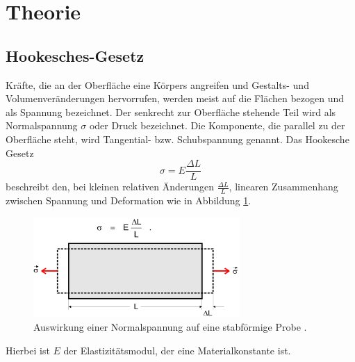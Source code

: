 \section{Theorie}
\label{sec:Theorie}
\subsection{Hookesches-Gesetz}
Kräfte, die an der Oberfläche eine Körpers angreifen und Gestalts- und Volumenveränderungen
hervorrufen, werden meist auf die Flächen bezogen und als Spannung bezeichnet.
Der senkrecht zur Oberfläche stehende Teil wird als Normalspannung $\sigma$ oder
Druck bezeichnet. Die Komponente, die parallel zu der Oberfläche steht, wird Tangential-
bzw. Schubspannung genannt. Das Hookesche Gesetz
\begin{equation}
  \sigma=E\frac{\Delta L}{L}
\end{equation}
beschreibt den, bei kleinen relativen Änderungen $\frac{\Delta L}{L}$, linearen
Zusammenhang zwischen Spannung und Deformation wie in Abbildung \ref{fig:Spannung}.
\begin{figure}[H]
  \centering
  \includegraphics[width=0.7\textwidth]{spannung.png}
  \caption{Auswirkung einer Normalspannung auf eine stabförmige Probe \cite{sample} .}
  \label{fig:Spannung}
\end{figure}
Hierbei ist $E$ der Elastizitätsmodul, der eine Materialkonstante ist.

